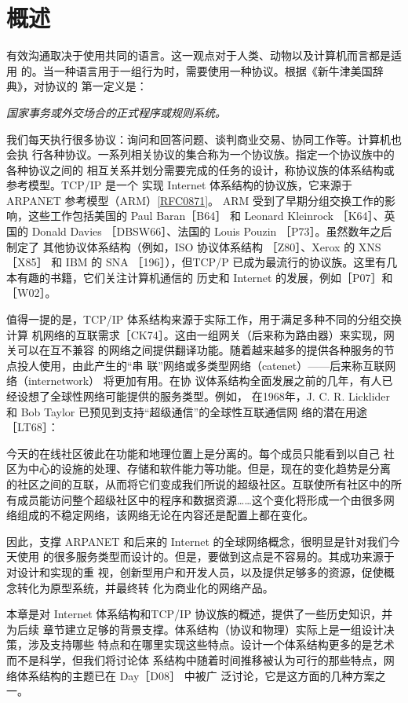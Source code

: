 \chapter{概述}
\minitoc

有效沟通取决于使用共同的语言。这一观点对于人类、动物以及计算机而言都是适用
的。当一种语言用于一组行为时，需要使用一种协议。根据《新牛津美国辞典》，对协议的
第一定义是：

\emph{国家事务或外交场合的正式程序或规则系统。}

我们每天执行很多协议：询问和回答问题、谈判商业交易、协同工作等。计算机也会执
行各种协议。一系列相关协议的集合称为一个协议族。指定一个协议族中的各种协议之间的
相互关系并划分需要完成的任务的设计，称协议族的体系结构或参考模型。TCP/IP 是一个
实现 Internet 体系结构的协议族，它来源于 ARPANET 参考模型（ARM）\href{https://www.rfc-editor.org/rfc/rfc0871}{[RFC0871]}。 ARM
受到了早期分组交换工作的影响，这些工作包括美国的 Paul Baran［B64］ 和 Leonard Kleinrock
［K64］、英国的 Donald Davies ［DBSW66］、法国的 Louis Pouzin ［P73］。虽然数年之后制定了
其他协议体系结构（例如，ISO 协议体系结构 ［Z80］、Xerox 的 XNS ［X85］ 和 IBM 的 SNA
［196］），但TCP/P 已成为最流行的协议族。这里有几本有趣的书籍，它们关注计算机通信的
历史和 Internet 的发展，例如［P07］和［W02］。

值得一提的是，TCP/IP 体系结构来源于实际工作，用于满足多种不同的分组交换计算
机网络的互联需求［CK74］。这由一组网关（后来称为路由器）来实现，网关可以在互不兼容
的网络之间提供翻译功能。随着越来越多的提供各种服务的节点投人使用，由此产生的“串
联”网络或多类型网络（catenet）——后来称互联网络（internetwork） 将更加有用。在协
议体系结构全面发展之前的几年，有人已经设想了全球性网络可能提供的服务类型。例如，
在1968年，J. C. R. Licklider 和 Bob Taylor 已预见到支持“超级通信”的全球性互联通信网
络的潜在用途 ［LT68］：

今天的在线社区彼此在功能和地理位置上是分离的。每个成员只能看到以自己
社区为中心的设施的处理、存储和软件能力等功能。但是，现在的变化趋势是分离
的社区之间的互联，从而将它们变成我们所说的超级社区。互联使所有社区中的所
有成员能访问整个超级社区中的程序和数据资源……这个变化将形成一个由很多网
络组成的不稳定网络，该网络无论在内容还是配置上都在变化。

因此，支撑 ARPANET 和后来的 Internet 的全球网络概念，很明显是针对我们今天使用
的很多服务类型而设计的。但是，要做到这点是不容易的。其成功来源于对设计和实现的重
视，创新型用户和开发人员，以及提供足够多的资源，促使概念转化为原型系统，并最终转
化为商业化的网络产品。

本章是对 Internet 体系结构和TCP/IP 协议族的概述，提供了一些历史知识，并为后续
章节建立足够的背景支撑。体系结构（协议和物理）实际上是一组设计决策，涉及支持哪些
特点和在哪里实现这些特点。设计一个体系结构更多的是艺术而不是科学，但我们将讨论体
系结构中随着时间推移被认为可行的那些特点，网络体系结构的主题已在 Day［D08］ 中被广
泛讨论，它是这方面的几种方案之一。

